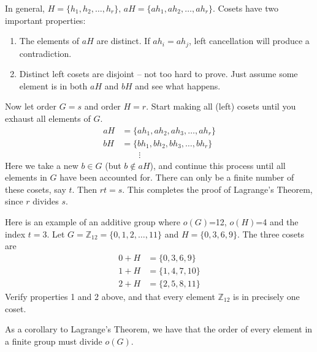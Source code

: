 \documentclass[12pt]{book}
\theoremstyle{definition}
\def\Z{\mathbb{Z}}
\begin{document}
In general, $H=\{h_1, h_2, \dots, h_r\},\,aH=\{ah_1, ah_2,\dots,ah_r\}$.  Cosets have two important properties:
\begin{enumerate}
\item The elements of $aH$ are distinct.  If $ah_i=ah_j$, left cancellation will produce a contradiction.
\item Distinct left cosets are disjoint -- not too hard to prove.  Just assume some element is in both $aH$ and $bH$ and see what happens.
\end{enumerate}
Now let order $G=s$ and order $H=r$.  Start making all (left) cosets until you exhaust all elements of $G$.
\begin{equation*}\begin{split}
aH&=\{ah_1,ah_2,ah_3,\dots,ah_r\}\\
bH&=\{bh_1,bh_2,bh_3,\dots,bh_r\}\\
&\qquad\vdots
\end{split}\end{equation*}
Here we take a new $ b\in G $ (but $ b\notin aH $), and continue this process until all elements in $ G $ have been accounted for. 
There can only be a finite number of these cosets, say $t$.  Then $rt=s$.  This completes the proof of Lagrange's Theorem, since $ r $ divides $ s $.

Here is an example of an additive group where $o(G)$=12, $o(H)$=4 and the index $t=3$.  Let $G=\Z_{12}=\{0,1,2,\dots,11\}$ and $H=\{0,3,6,9\}$.  The three cosets are
\begin{equation*}\begin{split}
0+H &= \{0,3,6,9\}\\
1+H&=\{1,4,7,10\}\\
2+H&=\{2,5,8,11\}
\end{split}\end{equation*}
Verify properties 1 and 2 above, and that every element $\Z_{12}$ is in precisely one coset.

As a corollary to Lagrange's Theorem, we have that the order of every element in a finite group must divide $o(G)$.\\
\end{document}
